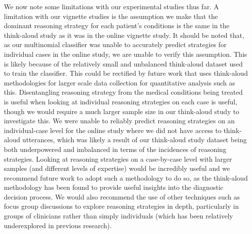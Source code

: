 \documentclass[a4paper, nobind]{templates/ociamthesis}
\begin{document}
We now note some limitations with our experimental studies thus far. A limitation with our vignette studies is the assumption we make that the dominant reasoning strategy for each patient's conditions is the same in the think-aloud study as it was in the online vignette study. It should be noted that, as our multinomial classifier was unable to accurately predict strategies for individual cases in the online study, we are unable to verify this assumption. This is likely because of the relatively small and unbalanced think-aloud dataset used to train the classifier. This could be rectified by future work that uses think-aloud methodologies for larger scale data collection for quantitative analysis such as this. Disentangling reasoning strategy from the medical conditions being treated is useful when looking at individual reasoning strategies on each case is useful, though we would require a much larger sample size in our think-aloud study to investigate this. We were unable to reliably predict reasoning strategies on an individual-case level for the online study where we did not have access to think-aloud utterances, which was likely a result of our think-aloud study dataset being both underpowered and imbalanced in terms of the incidences of reasoning strategies. Looking at reasoning strategies on a case-by-case level with larger samples (and different levels of expertise) would be incredibly useful and we recommend future work to adopt such a methodology to do so, as the think-aloud methodology has been found to provide useful insights into the diagnostic decision process. We would also recommend the use of other techniques such as focus group discussions to explore reasoning strategies in depth, particularly in groups of clinicians rather than simply individuals (which has been relatively underexplored in previous research).
\end{document}

